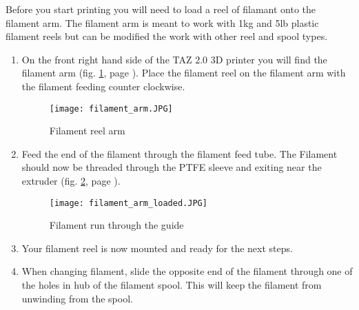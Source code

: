 
Before you start printing you will need to load a reel of filamant onto the filament arm. The filament arm is meant to work with 1kg and 5lb plastic filament reels but can be modified the work with other reel and spool types. 

\begin{enumerate}

\item On the front right hand side of the TAZ 2.0 3D printer you will find the filament arm (fig. \ref{fig:filament_arm}, page \pageref{fig:filament_arm}). Place the filament reel on the filament arm with the filament feeding counter clockwise.

\begin{figure}[H]
\centering
\texttt{[image: filament\_arm.JPG]}
\caption{Filament reel arm}
\label{fig:filament_arm}
\end{figure}

\item Feed the end of the filament through the filament feed tube. The Filament should now be threaded through the PTFE sleeve and exiting near the extruder (fig. \ref{fig:filament_arm_loaded}, page \pageref{fig:filament_arm_loaded}).

\begin{figure}[H]
\centering
\texttt{[image: filament\_arm\_loaded.JPG]}
\caption{Filament run through the guide}
\label{fig:filament_arm_loaded}
\end{figure}

\item Your filament reel is now mounted and ready for the next steps.

\item When changing filament, slide the opposite end of the filament through one of the holes in hub of the filament spool. This will keep the filament from unwinding from the spool.

\end{enumerate}

